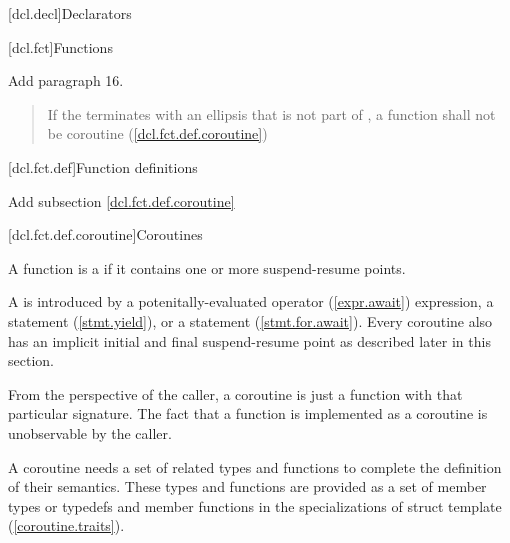 
[dcl.decl]{Declarators}

\setcounter{section}{3}
\setcounter{subsection}{4}
[dcl.fct]{Functions}%

Add paragraph 16.

\begin{quote}
\setcounter{Paras}{15}
\pnum
If the  terminates with an ellipsis that is not part of , a function shall not be coroutine (\ref{dcl.fct.def.coroutine}) 
\end{quote}

\setcounter{section}{3}
[dcl.fct.def]{Function definitions}

Add subsection \ref{dcl.fct.def.coroutine}

\setcounter{subsection}{3}
[dcl.fct.def.coroutine]{Coroutines}


\pnum
A function is a  if it contains
one or more suspend-resume points. 

\pnum
A  is introduced by a potenitally-evaluated  operator (\ref{expr.await}) expression,
a  statement (\ref{stmt.yield}), 
or a  statement (\ref{stmt.for.await}). Every coroutine
also has an implicit initial and final suspend-resume point as described later in this section. 

\pnum
\enternote
From the perspective of the caller, a coroutine is just a function with that particular signature. The fact that a function is implemented as a coroutine is unobservable by the caller. 
\exitnote

\pnum
A coroutine needs a set of related types and functions
to complete the definition of their semantics.
These types and functions are provided as a set of member types or typedefs
and member functions in the specializations of struct template
 (\ref{coroutine.traits}). 

